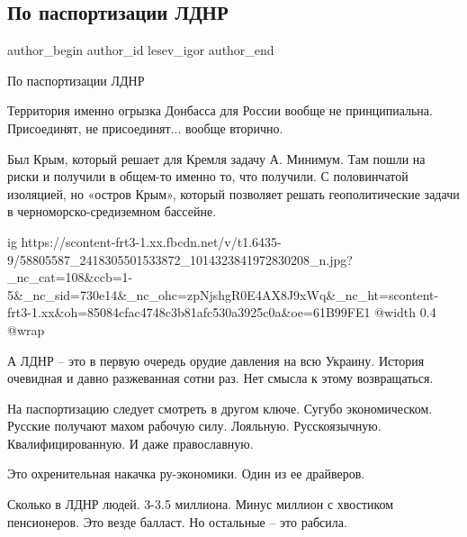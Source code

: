  
 
 
 
 
 
\subsection{По паспортизации ЛДНР}
\label{sec:27_04_2019.fb.lesev_igor.1.ldnr_passportizacia}
 
\ifcmt
 author_begin
   author_id lesev_igor
 author_end
\fi

По паспортизации ЛДНР

Территория именно огрызка Донбасса для России вообще не принципиальна.
Присоединят, не присоединят... вообще вторично.

Был Крым, который решает для Кремля задачу А. Минимум. Там пошли на риски и
получили в общем-то именно то, что получили. С половинчатой изоляцией, но
«остров Крым», который позволяет решать геополитические задачи в
черноморско-средиземном бассейне.

\ifcmt
  ig https://scontent-frt3-1.xx.fbcdn.net/v/t1.6435-9/58805587_2418305501533872_1014323841972830208_n.jpg?_nc_cat=108&ccb=1-5&_nc_sid=730e14&_nc_ohc=zpNjshgR0E4AX8J9xWq&_nc_ht=scontent-frt3-1.xx&oh=85084cfac4748c3b81afc530a3925c0a&oe=61B99FE1
  @width 0.4
  @wrap 
\fi

А ЛДНР – это в первую очередь орудие давления на всю Украину. История очевидная
и давно разжеванная сотни раз. Нет смысла к этому возвращаться.

На паспортизацию следует смотреть в другом ключе. Сугубо экономическом. Русские
получают махом рабочую силу. Лояльную. Русскоязычную. Квалифицированную. И даже
православную.

Это охренительная накачка ру-экономики. Один из ее драйверов.

Сколько в ЛДНР людей. 3-3.5 миллиона. Минус миллион с хвостиком пенсионеров.
Это везде балласт. Но остальные – это рабсила.

